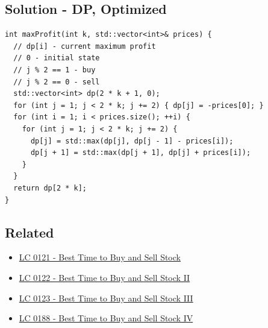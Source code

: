 \subsection*{Solution - DP, Optimized}
\begin{lstlisting}
int maxProfit(int k, std::vector<int>& prices) {
  // dp[i] - current maximum profit
  // 0 - initial state
  // j % 2 == 1 - buy
  // j % 2 == 0 - sell
  std::vector<int> dp(2 * k + 1, 0);
  for (int j = 1; j < 2 * k; j += 2) { dp[j] = -prices[0]; }
  for (int i = 1; i < prices.size(); ++i) {
    for (int j = 1; j < 2 * k; j += 2) {
      dp[j] = std::max(dp[j], dp[j - 1] - prices[i]);
      dp[j + 1] = std::max(dp[j + 1], dp[j] + prices[i]);
    }
  }
  return dp[2 * k];
}
\end{lstlisting}

\subsection*{Related}
\begin{itemize}
	\item \hyperref[lc0121]{LC 0121 - Best Time to Buy and Sell Stock}
	\item \hyperref[lc0122]{LC 0122 - Best Time to Buy and Sell Stock II}
	\item \hyperref[lc0123]{LC 0123 - Best Time to Buy and Sell Stock III}
	\item \hyperref[lc0188]{LC 0188 - Best Time to Buy and Sell Stock IV}
\end{itemize}